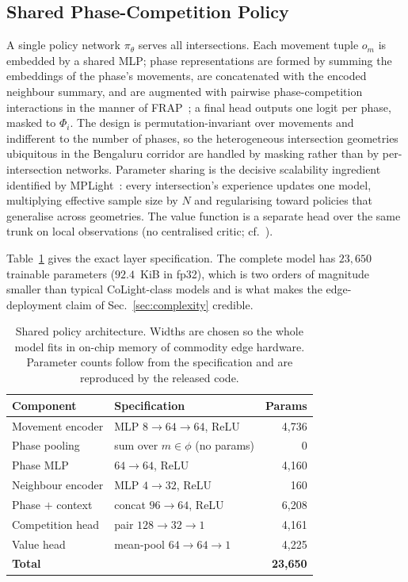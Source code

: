 \documentclass[journal]{IEEEtran}
\begin{document}
\subsection{Shared Phase-Competition Policy}
\label{subsec:policy}
A single policy network $\pi_\theta$ serves all intersections. Each
movement tuple $o_m$ is embedded by a shared MLP; phase representations
are formed by summing the embeddings of the phase's movements, are
concatenated with the encoded neighbour summary, and are augmented with
pairwise phase-competition interactions in the manner of
FRAP~\cite{b_frap}; a final head outputs one logit per phase, masked to
$\Phi_i$. The design is permutation-invariant over movements and
indifferent to the number of phases, so the heterogeneous intersection
geometries ubiquitous in the Bengaluru corridor are handled by masking
rather than by per-intersection networks. Parameter sharing is the
decisive scalability ingredient identified by MPLight~\cite{b_mplight}:
every intersection's experience updates one model, multiplying effective
sample size by $N$ and regularising toward policies that generalise
across geometries. The value function is a separate head over the same
trunk on local observations (no centralised critic;
cf.~\cite{b_mappo}).

Table~\ref{tab:arch} gives the exact layer specification. The complete
model has $23{,}650$ trainable parameters ($92.4$~KiB in fp32), which is
two orders of magnitude smaller than typical CoLight-class
models and is what makes the edge-deployment claim of
Sec.~\ref{sec:complexity} credible.

\begin{table}[htbp]
\caption{Shared policy architecture. Widths are chosen so the whole
model fits in on-chip memory of commodity edge hardware. Parameter counts
follow from the specification and are reproduced by the released code.}
\label{tab:arch}
\centering
\footnotesize
\begin{tabular}{@{}llr@{}}
\toprule
Component & Specification & Params \\
\midrule
Movement encoder     & MLP $8\!\to\!64\!\to\!64$, ReLU      & 4{,}736 \\
Phase pooling        & sum over $m\in\phi$ (no params)      & 0 \\
Phase MLP            & $64\!\to\!64$, ReLU                  & 4{,}160 \\
Neighbour encoder    & MLP $4\!\to\!32$, ReLU               & 160 \\
Phase $+$ context    & concat $96 \to 64$, ReLU             & 6{,}208 \\
Competition head     & pair $128\!\to\!32\!\to\!1$          & 4{,}161 \\
Value head           & mean-pool $64\!\to\!64\!\to\!1$      & 4{,}225 \\
\midrule
\textbf{Total}       &                                      & \textbf{23{,}650} \\
\bottomrule
\end{tabular}
\end{table}
\end{document}
